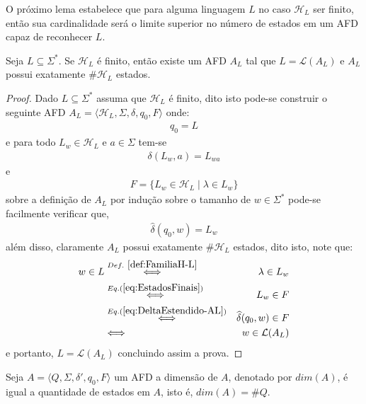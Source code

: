 O próximo lema estabelece que para alguma linguagem $L$ no caso $\mathcal{H}_L$ ser finito, então sua cardinalidade será o limite superior no número de estados em um AFD capaz de reconhecer $L$.

\begin{lemma}\label{lema:LimiteSuperiorEstados}
	Seja $L \subseteq \Sigma^*$. Se $\mathcal{H}_L$ é finito, então existe um AFD $A _L$ tal que $L = \mathcal{L}(A_L)$ e $A_L$ possui exatamente $\#\mathcal{H}_L$ estados.
\end{lemma}

\begin{proof}
	Dado $L \subseteq \Sigma^*$ assuma que $\mathcal{H}_L$ é finito, dito isto pode-se construir o seguinte AFD $A_L = \langle \mathcal{H}_L, \Sigma, \delta, q_0, F \rangle$ onde:
	\begin{eqnarray}\label{eq:EstadoInicial}
		q_0 = L
	\end{eqnarray}
	e para todo $L_w \in \mathcal{H}_L$ e $a \in \Sigma$ tem-se
	\begin{eqnarray}\label{eq:Delta-AL}
		\delta(L_w, a) = L_{wa}
	\end{eqnarray}
	e
	\begin{eqnarray}\label{eq:EstadosFinais}
		F = \{L_w \in \mathcal{H}_L \mid \lambda \in L_w\}
	\end{eqnarray}
	sobre a definição de $A_L$ por indução sobre o tamanho de $w \in \Sigma^*$ pode-se facilmente verificar que, 
	\begin{eqnarray}\label{eq:DeltaEstendido-AL}
		\widehat{\delta}(q_0, w) = L_w
	\end{eqnarray}
	além disso, claramente $A_L$ possui exatamente $\#\mathcal{H}_L$ estados, dito isto, note que:
	\begin{eqnarray*}
		w \in L & \stackrel{Def. \ \ref{def:FamiliaH-L}}{\Longleftrightarrow} & \lambda \in L_w\\
		& \stackrel{Eq. (\ref{eq:EstadosFinais})}{\Longleftrightarrow} & L_w \in F\\
		& \stackrel{Eq. (\ref{eq:DeltaEstendido-AL})}{\Longleftrightarrow} & \widehat{\delta}(q_0, w) \in F\\
		& \Longleftrightarrow & w \in \mathcal{L}(A_L)
	\end{eqnarray*}
	e portanto, $L = \mathcal{L}(A_L)$ concluindo assim a prova.
\end{proof}

\begin{definition}
	Seja $A = \langle Q, \Sigma, \delta', q_0, F \rangle$ um AFD a dimensão de $A$, denotado por $dim(A)$, é igual a quantidade de estados em $A$, isto é, $dim(A) = \# Q$. 
\end{definition}

